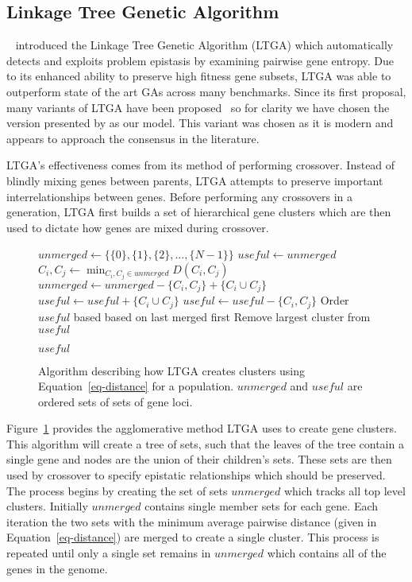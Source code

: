 \documentclass[twoside]{article}
\begin{document}
\subsection{Linkage Tree Genetic Algorithm}
~\cite{thierens:2010:ltga} introduced the Linkage Tree Genetic Algorithm (LTGA) which automatically
detects and exploits problem epistasis by examining pairwise gene entropy. Due to its enhanced
ability to preserve high fitness gene subsets, LTGA was able to outperform state of the art
GAs across many benchmarks. Since its first proposal, many variants of LTGA have been
proposed~\citep{goldman:2012:ltga} so for clarity we have chosen the version
presented by \cite{thierens:2013:ltgahiff} as our model. This variant was chosen as it is
modern and appears to approach the consensus in the literature.

LTGA's effectiveness comes from its method of performing crossover. Instead of blindly
mixing genes between parents, LTGA attempts to preserve important interrelationships
between genes. Before performing any crossovers in a generation, LTGA first builds
a set of hierarchical gene clusters which are then used to dictate how genes are mixed
during crossover.

\begin{figure}
  \begin{algorithmic}[1]
    \State $unmerged \leftarrow \{\{0\}, \{1\}, \{2\}, \dots, \{N-1\}\}$
    \State $useful \leftarrow unmerged$
      \State $C_i, C_j \leftarrow \min_{C_i,C_j \in unmerged} D(C_i, C_j)$
      \State $unmerged \leftarrow unmerged - \{C_i, C_j\} + \{C_i \cup C_j\}$
      \State $useful \leftarrow useful + \{C_i \cup C_j\}$
        \State $useful \leftarrow useful - \{C_i, C_j\}$
      \EndIf
    \EndWhile
    \State Order $useful$ based based on last merged first\label{fig-cluster-creation-ordering}
    \State Remove largest cluster from $useful$

    \Return $useful$
  \EndProcedure
\end{algorithmic}
  \caption{Algorithm describing how LTGA creates clusters using Equation~\ref{eq-distance}
           for a population. $unmerged$ and $useful$ are ordered sets of sets of gene loci.}
  \label{fig-cluster-creation}
\end{figure}

Figure~\ref{fig-cluster-creation} provides the agglomerative method LTGA uses to create gene clusters.
This algorithm will create a tree of sets, such that the leaves of the tree contain a single gene and
nodes are the union of their children's sets. These sets are then used by crossover to specify epistatic
relationships which should be preserved.
The process begins by creating the set of sets $unmerged$ which tracks all top level clusters. Initially
$unmerged$ contains single member sets for each gene. Each iteration the two sets with the minimum average pairwise
distance (given in Equation~\ref{eq-distance}) are merged to create a single cluster. This process is repeated
until only a single set remains in $unmerged$ which contains all of the genes in the genome.
\end{document}
